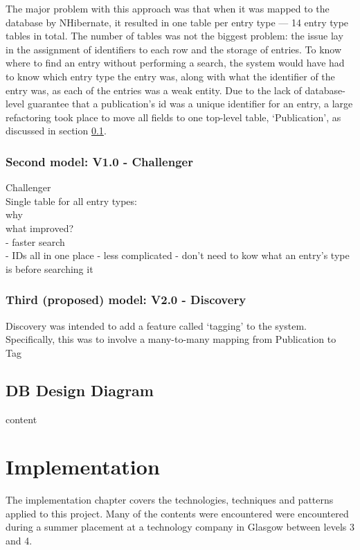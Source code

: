 \documentclass{l4proj}
\begin{document}
The major problem with this approach was that when it was mapped to the database by NHibernate, it resulted in one table per entry type --- 14 entry type tables in total.  The number of tables was not the biggest problem: the issue lay in the assignment of identifiers to each row and the storage of entries.  To know where to find an entry without performing a search, the system would have had to know which entry type the entry was, along with what the identifier of the entry was, as each of the entries was a weak entity.  Due to the lack of database-level guarantee that a publication's id was a unique identifier for an entry, a large refactoring took place to move all fields to one top-level table, `Publication', as discussed in section \ref{designChallenger}.

\subsection{Second model: V1.0 - Challenger}
\label{designChallenger}
Challenger\\
Single table for all entry types:\\
why\\
what improved?\\
 - faster search\\
 - IDs all in one place - less complicated - don't need to kow what an entry's type is before searching it\\

\subsection{Third (proposed) model: V2.0 - Discovery}
\label{designDiscovery}
Discovery was intended to add a feature called `tagging' to the system.  \\
Specifically, this was to involve a many-to-many mapping from Publication to Tag


\section{DB Design Diagram}
content


\chapter{Implementation}
\label{impl}
The implementation chapter covers the technologies, techniques and patterns applied to this project.  Many of the contents were encountered were encountered during a summer placement at a technology company in Glasgow between levels 3 and 4.  
\end{document}
